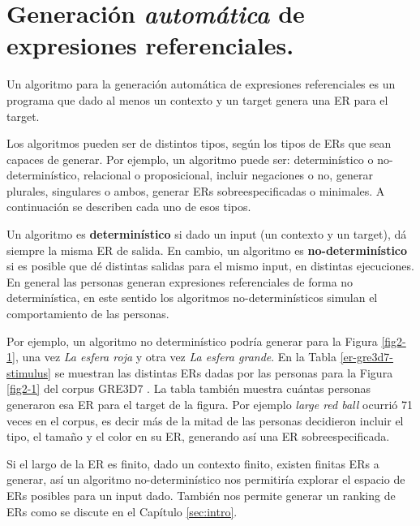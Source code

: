 \section{Generaci\'on \emph{autom\'atica} de expresiones referenciales.}
\label{sec:tipos_algoritmos}

Un algoritmo para la generaci\'on autom\'atica de expresiones referenciales es un programa que dado al menos un contexto y un target genera una ER para el target.

Los algoritmos pueden ser de distintos tipos, seg\'un los tipos de ERs que sean capaces de generar. Por ejemplo, un algoritmo puede ser: determin\'{i}stico o no-determin\'{i}stico, relacional o proposicional, incluir negaciones o no, generar plurales, singulares o ambos,
generar ERs sobreespecificadas o minimales. A continuaci\'on se describen cada uno de esos tipos.

Un algoritmo es {\bf determin\'{i}stico} si dado un input (un contexto y un target), d\'a siempre la misma ER de salida. En cambio, un algoritmo es {\bf no-determin\'{i}stico} si es posible que d\'e distintas salidas para el mismo input, en distintas ejecuciones. En general las personas generan expresiones referenciales de forma no determin\'istica, en este sentido los algoritmos no-determin\'isticos simulan el comportamiento de las personas. 

Por ejemplo, un algoritmo no determin\'istico podr\'ia generar para la Figura \ref{fig2-1}, una vez {\it La esfera roja} y otra vez {\it La esfera grande}. En la Tabla \ref{er-gre3d7-stimulus} se muestran las distintas ERs dadas por las personas para la Figura \ref{fig2-1} del corpus GRE3D7 \cite{gre3d7}. La tabla tambi\'en muestra cu\'antas personas generaron esa ER para el target de la figura. Por ejemplo {\it large red ball} ocurri\'o 71 veces en el corpus, es decir m\'as de la mitad de las personas decidieron incluir el tipo, el tama\~no y el color en su ER, generando as\'i una ER sobreespecificada.

Si el largo de la ER es finito, dado un contexto finito, existen finitas ERs a generar, as\'i un algoritmo no-determin\'istico nos permitir\'ia explorar el espacio de ERs posibles para un input dado. Tambi\'en nos permite generar un ranking de ERs como se discute en el Cap\'itulo \ref{sec:intro}.

